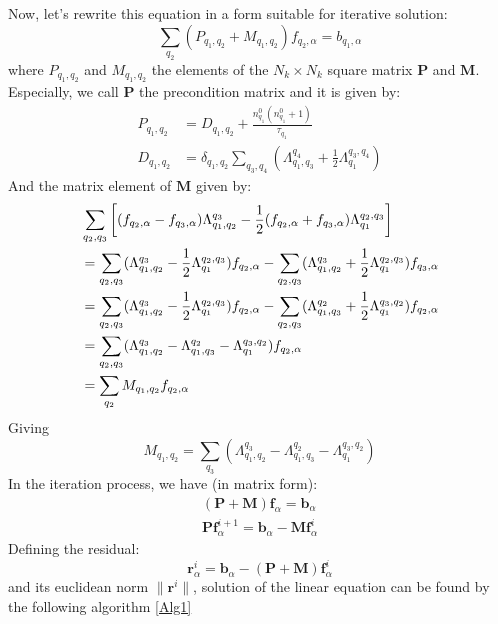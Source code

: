 \documentclass{article}
\begin{document}
Now, let's rewrite this equation in a form suitable for iterative solution:
\begin{equation}
    \sum_{q_2} \left( P_{q_1,q_2} + M_{q_1,q_2} \right)  f_{q_2,\alpha} = b_{q_1,\alpha}
\end{equation} 
where $P_{q_1,q_2}$ and $M_{q_1,q_2}$ the elements of the $N_k \times N_k$ square matrix
$\mathbf{P}$ and $\mathbf{M}$. Especially, we call $\mathbf{P}$ the precondition matrix and it is given by:
\begin{align}
    \label{E:P}
    P_{q_1,q_2} &= D_{q_1,q_2} + \frac{n_{q_1}^0(n_{q_1}^0+1)}{\tau_{q_1}} \\
    D_{q_1,q_2} &= \delta_{q_1,q_2}\sum_{q_3,q_4} \left( \Lambda_{q_1,q_3}^{q_4} + \frac{1}{2} \Lambda_{q_1}^{q_3, q_4} \right)
\end{align}
And the matrix element of $\mathbf{M}$ given by:
\begin{align}
    &\sum_{q_2,q_3} 
    \left[ (f_{q_2,\alpha} - f_{q_3,\alpha})\Lambda_{q_1,q_2}^{q_3} - \frac{1}{2} (f_{q_2,\alpha} + f_{q_3,\alpha}) \Lambda_{q_1}^{q_2, q_3} \right] \notag \\
    &= \sum_{q_2,q_3} (\Lambda_{q_1,q_2}^{q_3} - \frac{1}{2}\Lambda_{q_1}^{q_2, q_3}) f_{q_2,\alpha}
    - \sum_{q_2,q_3} (\Lambda_{q_1,q_2}^{q_3} + \frac{1}{2}\Lambda_{q_1}^{q_2, q_3}) f_{q_3,\alpha} \notag \\
    &= \sum_{q_2,q_3} (\Lambda_{q_1,q_2}^{q_3} - \frac{1}{2}\Lambda_{q_1}^{q_2, q_3}) f_{q_2,\alpha}
    - \sum_{q_2,q_3} (\Lambda_{q_1,q_3}^{q_2} + \frac{1}{2}\Lambda_{q_1}^{q_3, q_2}) f_{q_2,\alpha} \notag \\
    &= \sum_{q_2,q_3} (\Lambda_{q_1,q_2}^{q_3} - \Lambda_{q_1,q_3}^{q_2} - \Lambda_{q_1}^{q_3, q_2}) f_{q_2,\alpha} \notag \\
    &= \sum_{q_2} M_{q_1,q_2} f_{q_2,\alpha} 
\end{align}
Giving 
\begin{equation}
    \label{E:M}
    M_{q_1,q_2} = \sum_{q_3} (\Lambda_{q_1,q_2}^{q_3} - \Lambda_{q_1,q_3}^{q_2} - \Lambda_{q_1}^{q_3, q_2})
\end{equation}
In the iteration process, we have (in matrix form):
\begin{gather}
    ( \mathbf{P} + \mathbf{M} )  \mathbf{f}_{\alpha} = \mathbf{b}_{\alpha} \\
    \mathbf{P} \mathbf{f}_{\alpha}^{i+1} = \mathbf{b}_{\alpha} - \mathbf{M} \mathbf{f}_{\alpha}^i
\end{gather} 
Defining the residual:
\begin{equation}
    \mathbf{r}_{\alpha}^i =  \mathbf{b}_{\alpha} - ( \mathbf{P} + \mathbf{M} )  \mathbf{f}_{\alpha}^i
\end{equation}
and its euclidean norm $\|\mathbf{r}^i\|$, solution of the linear equation can be found by the following algorithm
\ref{Alg1}
\end{document}
